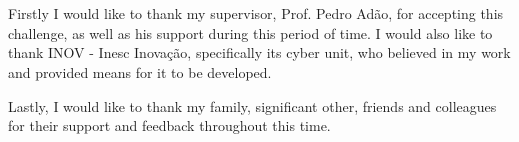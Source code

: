 
\section*{\acknowledgments}


Firstly I would like to thank my supervisor, Prof. Pedro Adão, for accepting this challenge, as well as his support during this period of time.
I would also like to thank INOV - Inesc Inovação, specifically its cyber unit, who believed in my work and provided means for it to be developed.

Lastly, I would like to thank my family, significant other, friends and colleagues for their support and feedback throughout this time.
